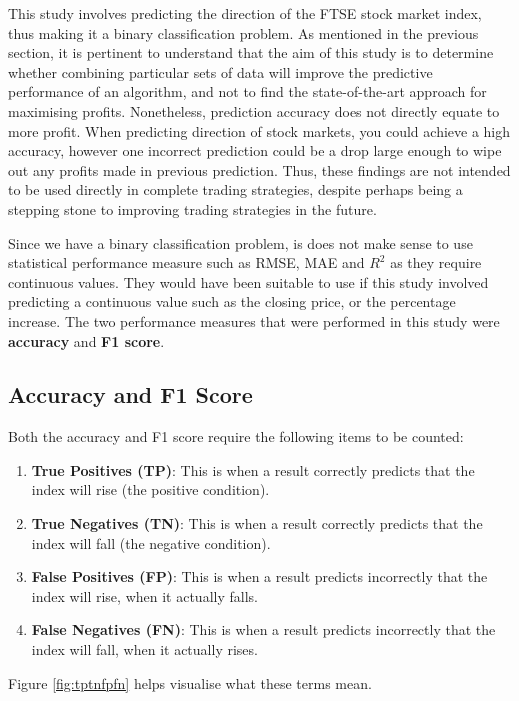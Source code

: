 \documentclass{UoYCSproject}
\begin{document}
This study involves predicting the direction of the FTSE stock market index, thus making it a binary classification problem. As mentioned in the previous section, it is pertinent to understand that the aim of this study is to determine whether combining particular sets of data will improve the predictive performance of an algorithm, and not to find the state-of-the-art approach for maximising profits. Nonetheless, prediction accuracy does not directly equate to more profit. When predicting direction of stock markets, you could achieve a high accuracy, however one incorrect prediction could be a drop large enough to wipe out any profits made in previous prediction. Thus, these findings are not intended to be used directly in complete trading strategies, despite perhaps being a stepping stone to improving trading strategies in the future. 

Since we have a binary classification problem, is does not make sense to use statistical performance measure such as RMSE, MAE and $R^2$ as they require continuous values. They would have been suitable to use if this study involved predicting a continuous value such as the closing price, or the percentage increase. The two performance measures that were performed in this study were \textbf{accuracy} and \textbf{F1 score}. 

\subsection{Accuracy and F1 Score}

Both the accuracy and F1 score require the following items to be counted:

\begin{enumerate}
    \item \textbf{True Positives (TP)}: This is when a result correctly predicts that the index will rise (the positive condition).
    \item \textbf{True Negatives (TN)}: This is when a result correctly predicts that the index will fall (the negative condition).
    \item \textbf{False Positives (FP)}: This is when a result predicts incorrectly that the index will rise, when it actually falls.
    \item \textbf{False Negatives (FN)}: This is when a result predicts incorrectly that the index will fall, when it actually rises.
\end{enumerate}

Figure \ref{fig:tptnfpfn} helps visualise what these terms mean.
\end{document}
